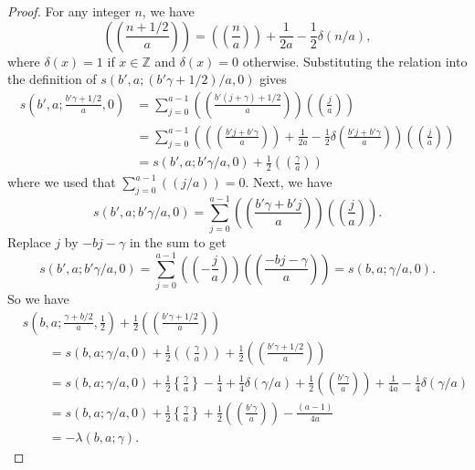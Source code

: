 \documentclass[10pt,a4paper]{amsart}
\begin{document}
\begin{proof}
For any integer $n$, we have
\[
\left( \! \left( \frac{n + 1/2}{a} \right) \! \right) = \left( \! \left( \frac{n}{a} \right) \! \right) + \frac{1}{2a} - \frac{1}{2} \delta(n/a),
\]
where $\delta(x) = 1$ if $x \in \mathbb{Z}$ and $\delta(x) = 0$ otherwise. Substituting the relation into the definition of $s(b',a ; (b'\gamma + 1/2)/a , 0)$ gives
\begin{align*}
s\left(b' , a ; \frac{b'\gamma + 1/2}{a} , 0 \right) &= \sum_{j=0}^{a-1} \left( \! \left( \frac{ b'(j+\gamma) + 1/2 }{a} \right) \! \right) \left( \! \left( \frac{j}{a} \right) \! \right) \\
&= \sum_{j=0}^{a-1} \left( \left( \! \left( \frac{b'j + b'\gamma}{a} \right) \! \right) + \frac{1}{2a} - \frac{1}{2} \delta\left( \frac{b'j + b'\gamma}{a} \right) \right) \left( \! \left( \frac{j}{a} \right) \! \right) \\
&= s(b',a ; b'\gamma/a , 0) + \frac{1}{2} \left( \! \left( \frac{ \gamma }{a} \right) \! \right)
\end{align*}
where we used that $\sum_{j=0}^{a-1} (( j/a )) = 0$. Next, we have 
\[
s(b',a ; b'\gamma/a , 0 ) = \sum_{j=0}^{a-1} \left( \! \left( \frac{ b'\gamma + b'j}{a} \right) \! \right) \left( \! \left( \frac{j}{a} \right) \! \right).
\]
Replace $j$ by $-bj-\gamma$ in the sum to get
\[
s(b',a ; b'\gamma/a , 0) = \sum_{j=0}^{a-1} \left( \! \left( -\frac{j}{a} \right) \! \right) \left( \! \left( \frac{-bj - \gamma}{a} \right) \! \right) = s(b,a ; \gamma/a , 0).
\]
So we have
\begin{align*}
& s\left(b,a ; \frac{ \gamma + b/2 }{a} , \frac{1}{2} \right) + \frac{1}{2}\left( \! \left( \frac{b'\gamma + 1/2}{a} \right) \! \right) \\
& \quad \quad = s(b,a ; \gamma/a , 0) + \frac{1}{2} \left( \! \left( \frac{\gamma}{a} \right) \! \right) + \frac{1}{2}\left( \! \left( \frac{b'\gamma + 1/2}{a} \right) \! \right) \\
& \quad \quad = s(b,a ; \gamma/a , 0) + \frac{1}{2} \left\{ \frac{\gamma}{a} \right\} - \frac{1}{4} + \frac{1}{4}\delta(\gamma/a) + \frac{1}{2}\left( \! \left( \frac{b'\gamma }{a} \right) \! \right) + \frac{1}{4a} - \frac{1}{4}\delta(\gamma/a) \\
& \quad \quad = s(b,a ; \gamma/a , 0) + \frac{1}{2} \left\{ \frac{\gamma}{a} \right\} + \frac{1}{2}\left( \! \left( \frac{b'\gamma }{a} \right) \! \right) - \frac{(a-1)}{4a} \\
& \quad \quad = -\lambda(b,a;\gamma).
\end{align*}

\end{proof}
\end{document}
